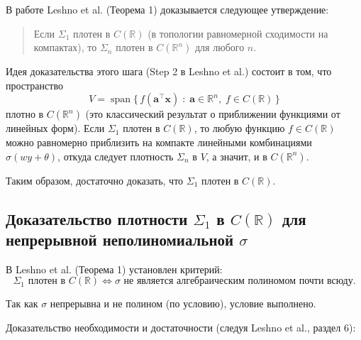 \documentclass[12pt]{article}
\DeclareMathOperator{\SpanOp}{span}
\begin{document}
	В работе Leshno et al. (Теорема 1) доказывается следующее утверждение:
	
	\begin{quote}
		Если $\Sigma_1$ плотен в $C(\mathbb{R})$ (в топологии равномерной сходимости на компактах), то $\Sigma_n$ плотен в $C(\mathbb{R}^n)$ для любого $n$.
	\end{quote}
	
	Идея доказательства этого шага (Step 2 в Leshno et al.) состоит в том, что пространство
	\[
	V = \SpanOp\{\, f(\mathbf{a}^{\!\top}\mathbf{x}) \;:\; \mathbf{a} \in \mathbb{R}^n,\; f \in C(\mathbb{R}) \,\}
	\]
	плотно в $C(\mathbb{R}^n)$ (это классический результат о приближении функциями от линейных форм).
	Если $\Sigma_1$ плотен в $C(\mathbb{R})$, то любую функцию $f \in C(\mathbb{R})$ можно равномерно приблизить на компакте линейными комбинациями $\sigma(w y + \theta)$, откуда следует плотность $\Sigma_n$ в $V$, а значит, и в $C(\mathbb{R}^n)$.
	
	Таким образом, достаточно доказать, что $\Sigma_1$ плотен в $C(\mathbb{R})$.
	
	\subsection{Доказательство плотности $\Sigma_1$ в $C(\mathbb{R})$ для непрерывной неполиномиальной $\sigma$}
	
	В Leshno et al. (Теорема 1) установлен критерий:
	\[
	\Sigma_1 \text{ плотен в } C(\mathbb{R}) \iff \sigma \text{ не является алгебраическим полиномом почти всюду.}
	\]
	
	Так как $\sigma$ непрерывна и не полином (по условию), условие выполнено.
	
	Доказательство необходимости и достаточности (следуя Leshno et al., раздел 6):
	
\end{document}
